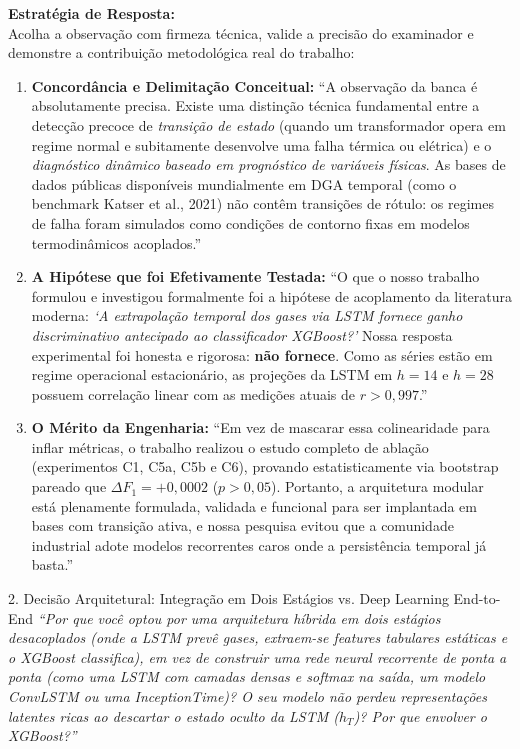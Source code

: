 \documentclass[11pt,a4paper]{article}
\begin{document}
\begin{boardAnswer}
\textbf{Estratégia de Resposta:}\\
Acolha a observação com firmeza técnica, valide a precisão do examinador e demonstre a contribuição metodológica real do trabalho:

\begin{enumerate}[leftmargin=0.8cm]
  \item \textbf{Concordância e Delimitação Conceitual:} ``A observação da banca é absolutamente precisa. Existe uma distinção técnica fundamental entre a detecção precoce de \textit{transição de estado} (quando um transformador opera em regime normal e subitamente desenvolve uma falha térmica ou elétrica) e o \textit{diagnóstico dinâmico baseado em prognóstico de variáveis físicas}. As bases de dados públicas disponíveis mundialmente em DGA temporal (como o benchmark Katser et al., 2021) não contêm transições de rótulo: os regimes de falha foram simulados como condições de contorno fixas em modelos termodinâmicos acoplados.''
  \item \textbf{A Hipótese que foi Efetivamente Testada:} ``O que o nosso trabalho formulou e investigou formalmente foi a hipótese de acoplamento da literatura moderna: \textit{`A extrapolação temporal dos gases via LSTM fornece ganho discriminativo antecipado ao classificador XGBoost?'} Nossa resposta experimental foi honesta e rigorosa: \textbf{não fornece}. Como as séries estão em regime operacional estacionário, as projeções da LSTM em $h=14$ e $h=28$ possuem correlação linear com as medições atuais de $r > 0{,}997$.''
  \item \textbf{O Mérito da Engenharia:} ``Em vez de mascarar essa colinearidade para inflar métricas, o trabalho realizou o estudo completo de ablação (experimentos C1, C5a, C5b e C6), provando estatisticamente via bootstrap pareado que $\Delta F_1 = +0{,}0002$ ($p > 0{,}05$). Portanto, a arquitetura modular está plenamente formulada, validada e funcional para ser implantada em bases com transição ativa, e nossa pesquisa evitou que a comunidade industrial adote modelos recorrentes caros onde a persistência temporal já basta.''
\end{enumerate}
\end{boardAnswer}

\begin{boardQuestion}{2. Decisão Arquitetural: Integração em Dois Estágios vs. Deep Learning End-to-End}
\textit{“Por que você optou por uma arquitetura híbrida em dois estágios desacoplados (onde a LSTM prevê gases, extraem-se features tabulares estáticas e o XGBoost classifica), em vez de construir uma rede neural recorrente de ponta a ponta (como uma LSTM com camadas densas e softmax na saída, um modelo ConvLSTM ou uma InceptionTime)? O seu modelo não perdeu representações latentes ricas ao descartar o estado oculto da LSTM ($h_T$)? Por que envolver o XGBoost?”}
\end{boardQuestion}
\end{document}
